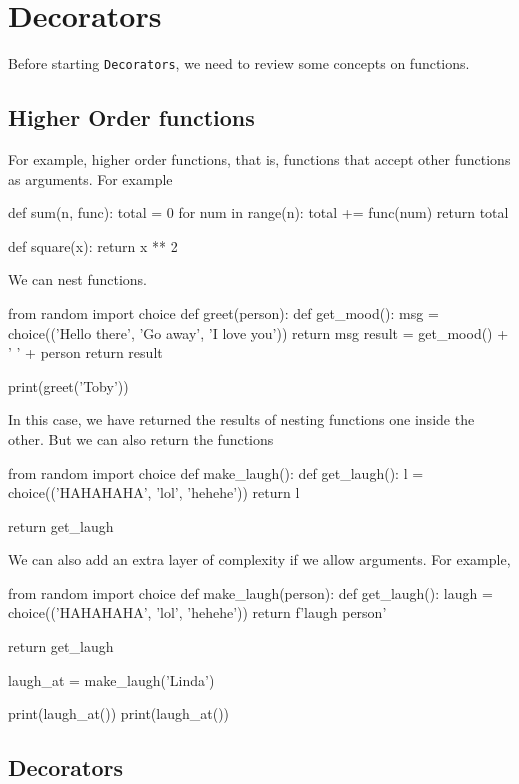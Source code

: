 \section{Decorators}

Before starting \verb|Decorators|, we need to review some concepts on functions. 

\subsection{Higher Order functions} For example, higher order functions, that is, functions that accept other functions as arguments. For example
\begin{listing}{1}
def sum(n, func):
    total = 0
    for num in range(n):
        total += func(num)
    return total

def square(x):
    return x ** 2        
\end{listing}

We can nest functions. 
\begin{listing}{1}
from random import choice
def greet(person):
    def get_mood():
        msg = choice(('Hello there', 'Go away', 'I love you'))
        return msg
    result = get_mood() + ' ' + person 
    return result

print(greet('Toby'))
\end{listing}
In this case, we have returned the results of nesting functions one inside the other. But we can also return the functions 
\begin{listing}{1}
from random import choice
def make_laugh():
    def get_laugh():
        l = choice(('HAHAHAHA', 'lol', 'hehehe'))
        return l
    
    return get_laugh
\end{listing}

We can also add an extra layer of complexity if we allow arguments. For example, 
\begin{listing}{1}
from random import choice
def make_laugh(person):
    def get_laugh():
        laugh = choice(('HAHAHAHA', 'lol', 'hehehe'))
        return f'{laugh} {person}'
    
    return get_laugh

laugh_at = make_laugh('Linda')

print(laugh_at())
print(laugh_at())
\end{listing}


\subsection{Decorators}

